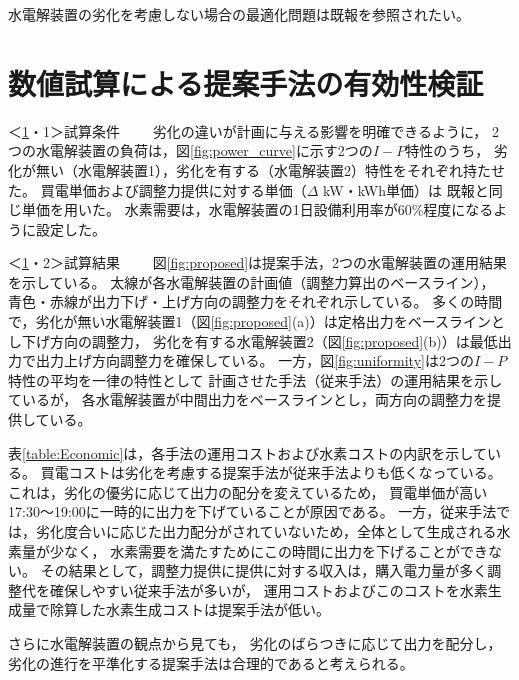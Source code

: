 \documentclass[fleqn]{ieej}
\begin{document}
水電解装置の劣化を考慮しない場合の最適化問題は既報\cite{Nakamura_2021}を参照されたい。

\vspace{-2mm}

\section{数値試算による提案手法の有効性検証}\label{sec:simulation}

\vspace{-2mm}

＜\ref{sec:simulation}・1＞試算条件　　%
劣化の違いが計画に与える影響を明確できるように，
2つの水電解装置の負荷は，図\ref{fig:power_curve}に示す2つの$I-P$特性のうち，
劣化が無い（水電解装置1），劣化を有する（水電解装置2）特性をそれぞれ持たせた。
買電単価および調整力提供に対する単価（$\Delta$ kW・kWh単価）は
既報\cite{Nakamura_2023}と同じ単価を用いた。
水素需要は，水電解装置の1日設備利用率が60\%程度になるように設定した。


＜\ref{sec:simulation}・2＞試算結果　　
図\ref{fig:proposed}は提案手法，2つの水電解装置の運用結果を示している。
太線が各水電解装置の計画値（調整力算出のベースライン），
青色・赤線が出力下げ・上げ方向の調整力をそれぞれ示している。
多くの時間で，劣化が無い水電解装置1（図\ref{fig:proposed}(a)）は定格出力をベースラインとし下げ方向の調整力，
劣化を有する水電解装置2（図\ref{fig:proposed}(b)）は最低出力で出力上げ方向調整力を確保している。
一方，図\ref{fig:uniformity}は2つの$I-P$特性の平均を一律の特性として
計画させた手法（従来手法）の運用結果を示しているが，
各水電解装置が中間出力をベースラインとし，両方向の調整力を提供している。

表\ref{table:Economic}は，各手法の運用コストおよび水素コストの内訳を示している。
買電コストは劣化を考慮する提案手法が従来手法よりも低くなっている。
これは，劣化の優劣に応じて出力の配分を変えているため，
買電単価が高い17:30～19:00に一時的に出力を下げていることが原因である。
一方，従来手法では，劣化度合いに応じた出力配分がされていないため，全体として生成される水素量が少なく，
水素需要を満たすためにこの時間に出力を下げることができない。
その結果として，調整力提供に提供に対する収入は，購入電力量が多く調整代を確保しやすい従来手法が多いが，
運用コストおよびこのコストを水素生成量で除算した水素生成コストは提案手法が低い。%

さらに水電解装置の観点から見ても，
劣化のばらつきに応じて出力を配分し，劣化の進行を平準化する提案手法は合理的であると考えられる。
\end{document}
